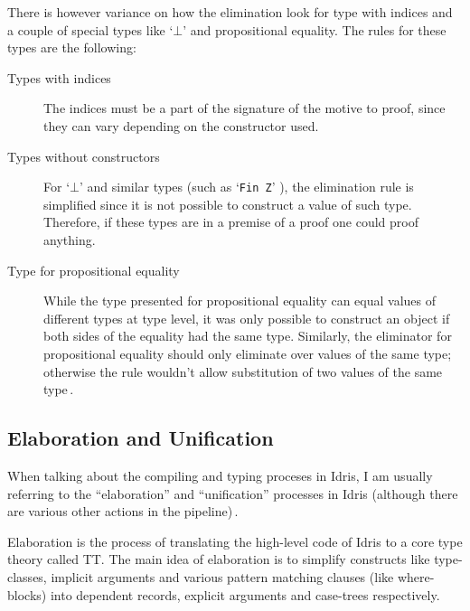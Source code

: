 \documentclass[a4paper]{article}%
\begin{document}
There is however variance on how the elimination look for type with indices and a couple of special types like `\texttt{$\bot$}' and propositional equality. The rules for these types are the following:
\begin{description}
  \item[Types with indices] The indices must be a part of the signature of the motive to proof, since they can vary depending on the constructor used.
  \item[Types without constructors] For `\texttt{$\bot$}' and similar types (such as `\texttt{Fin Z}' ), the elimination rule is simplified since it is not possible to construct a value of such type. Therefore, if these types are in a premise of a proof one could proof anything.
  \item[Type for propositional equality] While the type presented for propositional equality can equal values of different types at type level, it was only possible to construct an object if both sides of the equality had the same type. Similarly, the eliminator
    for propositional equality should only eliminate over values of the same type; otherwise the rule wouldn't allow substitution of two values of the same type\,\cite{mcbride1999thesis}.
\end{description}

\subsection{Elaboration and Unification}
\label{sub:ElaborationandUnification}
When talking about the compiling and typing proceses in Idris, I am usually referring to the ``elaboration'' and ``unification'' processes in Idris (although there are various other actions in the pipeline)\,\cite{brady2013idris}.

Elaboration is the process of translating the high-level code of Idris to a core type theory called TT\@. The main idea of elaboration is to simplify constructs like type-classes, implicit arguments and various pattern matching clauses (like where-blocks) into
dependent records, explicit arguments and case-trees respectively.
\end{document}

